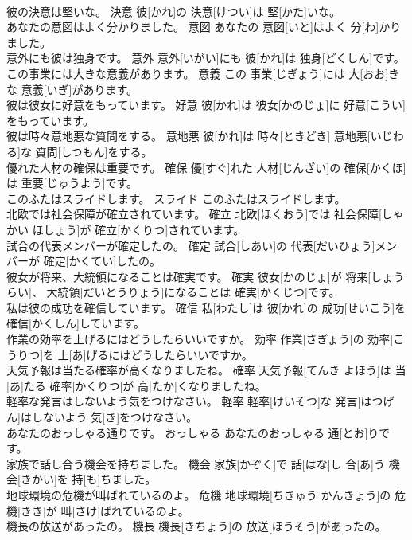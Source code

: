 \documentclass[8pt]{extreport}
\begin{document}
\begin{CJK}{UTF8}{min}
\\	彼の決意は堅いな。	決意	彼[かれ]の 決意[けつい]は 堅[かた]いな。	
\\	あなたの意図はよく分かりました。	意図	あなたの 意図[いと]はよく 分[わ]かりました。	
\\	意外にも彼は独身です。	意外	意外[いがい]にも 彼[かれ]は 独身[どくしん]です。	
\\	この事業には大きな意義があります。	意義	この 事業[じぎょう]には 大[おお]きな 意義[いぎ]があります。	
\\	彼は彼女に好意をもっています。	好意	彼[かれ]は 彼女[かのじょ]に 好意[こうい]をもっています。	
\\	彼は時々意地悪な質問をする。	意地悪	彼[かれ]は 時々[ときどき] 意地悪[いじわる]な 質問[しつもん]をする。	
\\	優れた人材の確保は重要です。	確保	優[すぐ]れた 人材[じんざい]の 確保[かくほ]は 重要[じゅうよう]です。	
\\	このふたはスライドします。	スライド	このふたはスライドします。	
\\	北欧では社会保障が確立されています。	確立	北欧[ほくおう]では 社会保障[しゃかい ほしょう]が 確立[かくりつ]されています。	
\\	試合の代表メンバーが確定したの。	確定	試合[しあい]の 代表[だいひょう]メンバーが 確定[かくてい]したの。	
\\	彼女が将来、大統領になることは確実です。	確実	彼女[かのじょ]が 将来[しょうらい]、 大統領[だいとうりょう]になることは 確実[かくじつ]です。	
\\	私は彼の成功を確信しています。	確信	私[わたし]は 彼[かれ]の 成功[せいこう]を 確信[かくしん]しています。	
\\	作業の効率を上げるにはどうしたらいいですか。	効率	作業[さぎょう]の 効率[こうりつ]を 上[あ]げるにはどうしたらいいですか。	
\\	天気予報は当たる確率が高くなりましたね。	確率	天気予報[てんき よほう]は 当[あ]たる 確率[かくりつ]が 高[たか]くなりましたね。	
\\	軽率な発言はしないよう気をつけなさい。	軽率	軽率[けいそつ]な 発言[はつげん]はしないよう 気[き]をつけなさい。	
\\	あなたのおっしゃる通りです。	おっしゃる	あなたのおっしゃる 通[とお]りです。	
\\	家族で話し合う機会を持ちました。	機会	家族[かぞく]で 話[はな]し 合[あ]う 機会[きかい]を 持[も]ちました。	
\\	地球環境の危機が叫ばれているのよ。	危機	地球環境[ちきゅう かんきょう]の 危機[きき]が 叫[さけ]ばれているのよ。	
\\	機長の放送があったの。	機長	機長[きちょう]の 放送[ほうそう]があったの。	

\end{CJK}
\end{document}
